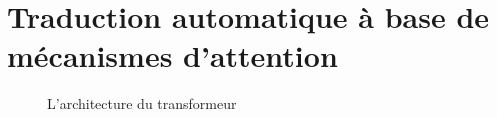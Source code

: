 \section{Traduction automatique à base de mécanismes d'attention}
\label{sec:nmt-attention}

\begin{figure}
    \begin{center}
        
    \end{center}
    \caption[L'architecture du transformeur]
    {L'architecture du transformeur~\cite[Fig 1]{attention}}
    \label{fig:transformer}
\end{figure}

\begin{figure}
    \begin{center}
        
    \end{center}
\end{figure}